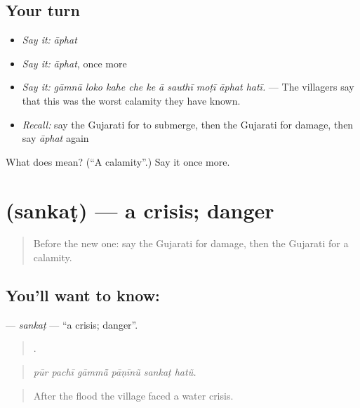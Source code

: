 \subsection*{Your turn}
\begin{itemize}
\raggedright
  \item \emph{Say it:} \emph{āphat}
  \item \emph{Say it:} \emph{āphat}, once more
  \item \emph{Say it:} \emph{gāmnā loko kahe che ke ā sauthī moṭī āphat hatī.} — The villagers say that this was the worst calamity they have known.
  \item \emph{Recall:} say the Gujarati for to submerge, then the Gujarati for damage, then say \emph{āphat} again
\end{itemize}

\begin{tcolorbox}[breakable,colback=teal!4,colframe=teal!35!black,title={Before you move on}]
What does  mean? (\textquotedblleft{}A calamity\textquotedblright{}.) Say it once more.
\end{tcolorbox}
\section[\texorpdfstring{\gu{સંકટ} (sankaṭ)}{સંકટ (sankaṭ)}]{ (sankaṭ) — a crisis; danger}

\label{lesson:GU-C304-sankat}



\begin{quote}
Before the new one: say the Gujarati for damage, then the Gujarati for a calamity.
\end{quote}

\subsection*{You'll want to know: }
\textbf{} — \emph{sankaṭ} — \textquotedblleft{}a crisis; danger\textquotedblright{}.

\begin{quote}
     .
\end{quote}

\begin{quote}
\emph{pūr pachī gāmmā̃ pāṇīnũ sankaṭ hatũ.}
\end{quote}

\begin{quote}
After the flood the village faced a water crisis.
\end{quote}

